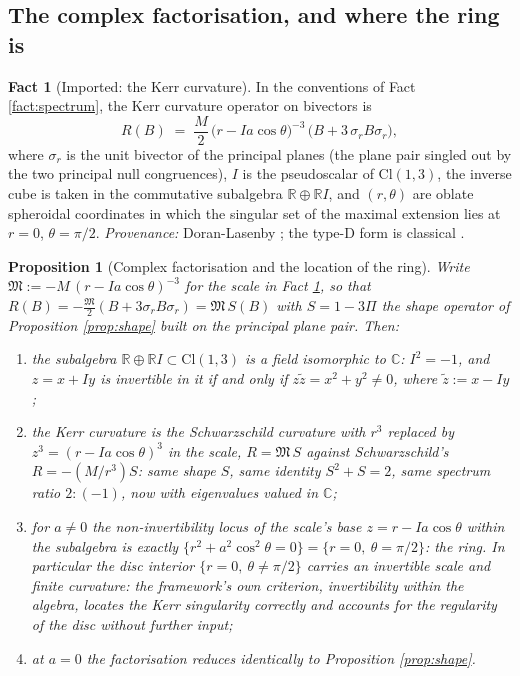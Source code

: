 \documentclass[11pt]{article}
\newtheorem{proposition}[theorem]{Proposition}
\theoremstyle{definition}
\newtheorem{fact}[theorem]{Fact}
\newcommand{\Cl}{\mathrm{Cl}}
\newcommand{\R}{\mathbb{R}}
\newcommand{\C}{\mathbb{C}}
\begin{document}
\subsection{The complex factorisation, and where the ring is}\label{subsec:ring}

\begin{fact}[Imported: the Kerr curvature]\label{fact:kerrcurv}
In the conventions of Fact \ref{fact:spectrum}, the Kerr curvature operator on bivectors is
\[
R(B) \;=\; \frac{M}{2}\,\bigl(r - I a\cos\theta\bigr)^{-3}\,\bigl(B + 3\,\sigma_r B\sigma_r\bigr),
\]
where $\sigma_r$ is the unit bivector of the principal planes (the plane pair singled out by the two principal null congruences), $I$ is the pseudoscalar of $\Cl(1,3)$, the inverse cube is taken in the commutative subalgebra $\R \oplus \R I$, and $(r,\theta)$ are oblate spheroidal coordinates in which the singular set of the maximal extension lies at $r = 0$, $\theta = \pi/2$. \emph{Provenance:} Doran-Lasenby \cite[Ch.~14]{DoranLasenby2003}; the type-D form is classical \cite{Carter1968}.
\end{fact}

\begin{proposition}[Complex factorisation and the location of the ring]\label{prop:ring}
Write $\mathfrak{M} := -M\,(r - Ia\cos\theta)^{-3}$ for the scale in Fact \ref{fact:kerrcurv}, so that $R(B) = -\tfrac{\mathfrak M}{2}(B + 3\sigma_rB\sigma_r) = \mathfrak{M}\,S(B)$ with $S = 1 - 3\Pi$ the shape operator of Proposition \ref{prop:shape} built on the principal plane pair. Then:
\begin{enumerate}
\item the subalgebra $\R \oplus \R I \subset \Cl(1,3)$ is a field isomorphic to $\C$: $I^2 = -1$, and $z = x + Iy$ is invertible in it if and only if $z\tilde z = x^2 + y^2 \neq 0$, where $\tilde z := x - Iy$;
\item the Kerr curvature is the Schwarzschild curvature with $r^3$ replaced by $z^3 = (r - Ia\cos\theta)^3$ in the scale, $R = \mathfrak M\,S$ against Schwarzschild's $R = -(M/r^3)S$: same shape $S$, same identity $S^2 + S = 2$, same spectrum ratio $2{:}(-1)$, now with eigenvalues valued in $\C$;
\item for $a \neq 0$ the non-invertibility locus of the scale's base $z = r - Ia\cos\theta$ within the subalgebra is exactly $\{r^2 + a^2\cos^2\theta = 0\} = \{r = 0,\ \theta = \pi/2\}$: the ring. In particular the disc interior $\{r = 0,\ \theta \neq \pi/2\}$ carries an invertible scale and finite curvature: the framework's own criterion, invertibility within the algebra, locates the Kerr singularity correctly and accounts for the regularity of the disc without further input;
\item at $a = 0$ the factorisation reduces identically to Proposition \ref{prop:shape}.
\end{enumerate}
\end{proposition}
\end{document}
